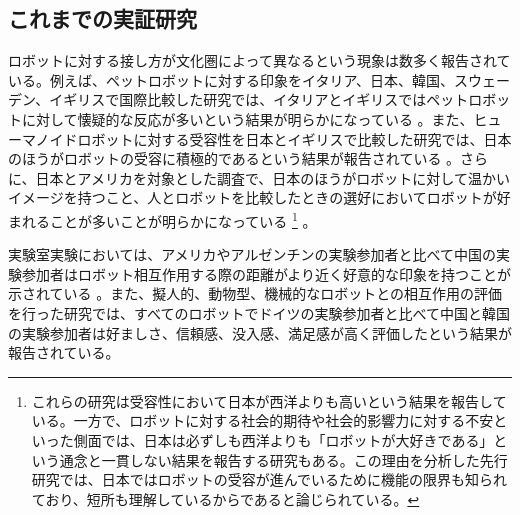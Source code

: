 \documentclass[a4j,12pt]{jreport}
\begin{document}
\subsection{これまでの実証研究}
ロボットに対する接し方が文化圏によって異なるという現象は数多く報告されている。例えば、ペットロボットに対する印象をイタリア、日本、韓国、スウェーデン、イギリスで国際比較した研究では、イタリアとイギリスではペットロボットに対して懐疑的な反応が多いという結果が明らかになっている\cite{paro} 。また、ヒューマノイドロボットに対する受容性を日本とイギリスで比較した研究では、日本のほうがロボットの受容に積極的であるという結果が報告されている\cite{humuk} 。さらに、日本とアメリカを対象とした調査で、日本のほうがロボットに対して温かいイメージを持つこと、人とロボットを比較したときの選好においてロボットが好まれることが多いことが明らかになっている\cite{mania} \footnote{これらの研究は受容性において日本が西洋よりも高いという結果を報告している。一方で、ロボットに対する社会的期待や社会的影響力に対する不安といった側面では、日本は必ずしも西洋よりも「ロボットが大好きである」という通念と一貫しない結果を報告する研究もある。この理由を分析した先行研究\cite{aibo}では、日本ではロボットの受容が進んでいるために機能の限界も知られており、短所も理解しているからであると論じられている。} 。


実験室実験においては、アメリカやアルゼンチンの実験参加者と比べて中国の実験参加者はロボット相互作用する際の距離がより近く好意的な印象を持つことが示されている\cite{argen} 。また、擬人的、動物型、機械的なロボットとの相互作用の評価を行った研究では\cite{german}、すべてのロボットでドイツの実験参加者と比べて中国と韓国の実験参加者は好ましさ、信頼感、没入感、満足感が高く評価したという結果が報告されている。

\end{document}
